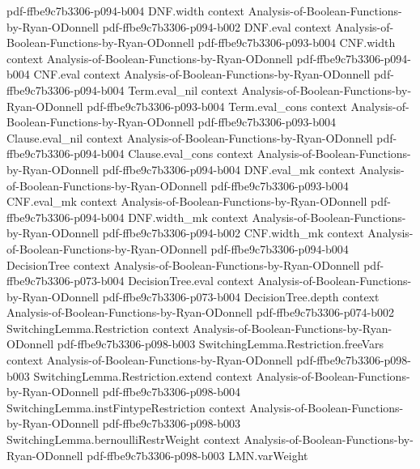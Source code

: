 \begin{theorem}
  {pdf-ffbe9c7b3306-p094-b004}
\proofstep
  {DNF.width}
  {context}
  {Analysis-of-Boolean-Functions-by-Ryan-ODonnell}
  {pdf-ffbe9c7b3306-p094-b002}
\proofstep
  {DNF.eval}
  {context}
  {Analysis-of-Boolean-Functions-by-Ryan-ODonnell}
  {pdf-ffbe9c7b3306-p093-b004}
\proofstep
  {CNF.width}
  {context}
  {Analysis-of-Boolean-Functions-by-Ryan-ODonnell}
  {pdf-ffbe9c7b3306-p094-b004}
\proofstep
  {CNF.eval}
  {context}
  {Analysis-of-Boolean-Functions-by-Ryan-ODonnell}
  {pdf-ffbe9c7b3306-p094-b004}
\proofstep
  {Term.eval_nil}
  {context}
  {Analysis-of-Boolean-Functions-by-Ryan-ODonnell}
  {pdf-ffbe9c7b3306-p093-b004}
\proofstep
  {Term.eval_cons}
  {context}
  {Analysis-of-Boolean-Functions-by-Ryan-ODonnell}
  {pdf-ffbe9c7b3306-p093-b004}
\proofstep
  {Clause.eval_nil}
  {context}
  {Analysis-of-Boolean-Functions-by-Ryan-ODonnell}
  {pdf-ffbe9c7b3306-p094-b004}
\proofstep
  {Clause.eval_cons}
  {context}
  {Analysis-of-Boolean-Functions-by-Ryan-ODonnell}
  {pdf-ffbe9c7b3306-p094-b004}
\proofstep
  {DNF.eval_mk}
  {context}
  {Analysis-of-Boolean-Functions-by-Ryan-ODonnell}
  {pdf-ffbe9c7b3306-p093-b004}
\proofstep
  {CNF.eval_mk}
  {context}
  {Analysis-of-Boolean-Functions-by-Ryan-ODonnell}
  {pdf-ffbe9c7b3306-p094-b004}
\proofstep
  {DNF.width_mk}
  {context}
  {Analysis-of-Boolean-Functions-by-Ryan-ODonnell}
  {pdf-ffbe9c7b3306-p094-b002}
\proofstep
  {CNF.width_mk}
  {context}
  {Analysis-of-Boolean-Functions-by-Ryan-ODonnell}
  {pdf-ffbe9c7b3306-p094-b004}
\proofstep
  {DecisionTree}
  {context}
  {Analysis-of-Boolean-Functions-by-Ryan-ODonnell}
  {pdf-ffbe9c7b3306-p073-b004}
\proofstep
  {DecisionTree.eval}
  {context}
  {Analysis-of-Boolean-Functions-by-Ryan-ODonnell}
  {pdf-ffbe9c7b3306-p073-b004}
\proofstep
  {DecisionTree.depth}
  {context}
  {Analysis-of-Boolean-Functions-by-Ryan-ODonnell}
  {pdf-ffbe9c7b3306-p074-b002}
\proofstep
  {SwitchingLemma.Restriction}
  {context}
  {Analysis-of-Boolean-Functions-by-Ryan-ODonnell}
  {pdf-ffbe9c7b3306-p098-b003}
\proofstep
  {SwitchingLemma.Restriction.freeVars}
  {context}
  {Analysis-of-Boolean-Functions-by-Ryan-ODonnell}
  {pdf-ffbe9c7b3306-p098-b003}
\proofstep
  {SwitchingLemma.Restriction.extend}
  {context}
  {Analysis-of-Boolean-Functions-by-Ryan-ODonnell}
  {pdf-ffbe9c7b3306-p098-b004}
\proofstep
  {SwitchingLemma.instFintypeRestriction}
  {context}
  {Analysis-of-Boolean-Functions-by-Ryan-ODonnell}
  {pdf-ffbe9c7b3306-p098-b003}
\proofstep
  {SwitchingLemma.bernoulliRestrWeight}
  {context}
  {Analysis-of-Boolean-Functions-by-Ryan-ODonnell}
  {pdf-ffbe9c7b3306-p098-b003}
\proofstep
  {LMN.varWeight}

\end{theorem}
